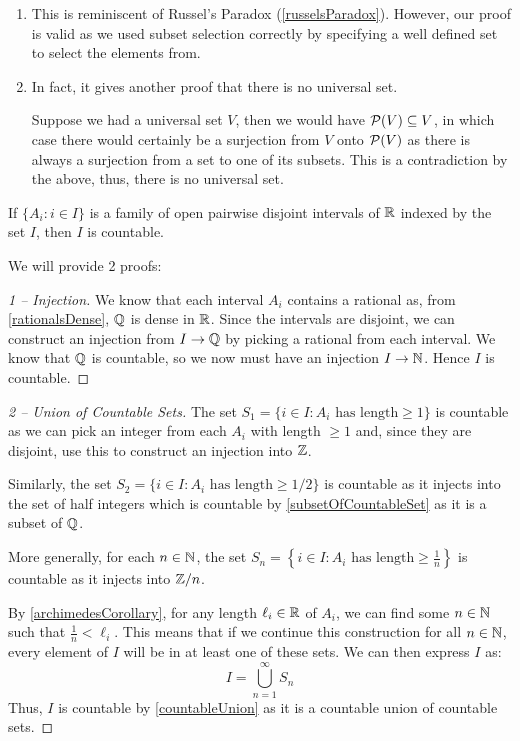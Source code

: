\documentclass[../main.tex]{subfiles}
\begin{document}
\begin{remark}[Remarks]
  \begin{enumerate}
    \item This is reminiscent of Russel's Paradox (\cref{russelsParadox}).
      However, our proof is valid as we used subset selection correctly by specifying a well defined set to select the elements from.
    \item In fact, it gives another proof that there is no universal set.

      Suppose we had a universal set $V$, then we would have $\mathcal{P}(V) \subseteq V$, in which case there would certainly be a surjection from $V$ onto $\mathcal{P}(V)$ as there is always a surjection from a set to one of its subsets.
      This is a contradiction by the above, thus, there is no universal set.
  \end{enumerate}
\end{remark}
\begin{proposition}
  If $\{A_i : i \in I\}$ is a family of open pairwise disjoint intervals of $\mathbb{R}$ indexed by the set $I$, then $I$ is countable.
  \label{intervalsExample}
\end{proposition}
We will provide 2 proofs:
\begin{proof}[1 -- Injection]
  We know that each interval $A_i$ contains a rational as, from \cref{rationalsDense}, $\mathbb{Q}$ is dense in $\mathbb{R}$.
  Since the intervals are disjoint, we can construct an injection from $I \to \mathbb{Q}$ by picking a rational from each interval.
  We know that $\mathbb{Q}$ is countable, so we now must have an injection $I \to \mathbb{N}$.
  Hence $I$ is countable.
\end{proof}
\begin{proof}[2 -- Union of Countable Sets]
  The set $S_1 = \{i \in I: A_i \text{ has length} \geq 1\}$ is countable as we can pick an integer from each $A_i$ with length $\geq 1$ and, since they are disjoint, use this to construct an injection into $\mathbb{Z}$.

  Similarly, the set $S_2 = \{i \in I: A_i \text{ has length}\geq 1/2\}$ is countable as it injects into the set of half integers which is countable by \cref{subsetOfCountableSet} as it is a subset of $\mathbb{Q}$.

  More generally, for each $n \in \mathbb{N}$, the set $S_n = \left\{i \in I : A_i \text{ has length} \geq \frac{1}{n}\right\}$ is countable as it injects into $\mathbb{Z}/n$.

  By \cref{archimedesCorollary}, for any length $\ell_i \in \mathbb{R}$ of $A_i$, we can find some $n \in \mathbb{N}$ such that $\frac{1}{n} < \ell_i$.
  This means that if we continue this construction for all $n \in \mathbb{N}$, every element of $I$ will be in at least one of these sets.
  We can then express $I$ as:
  \[
    I = \bigcup_{n = 1}^{\infty} S_n
  \]
  Thus, $I$ is countable by \cref{countableUnion} as it is a countable union of countable sets.
\end{proof}
\end{document}
